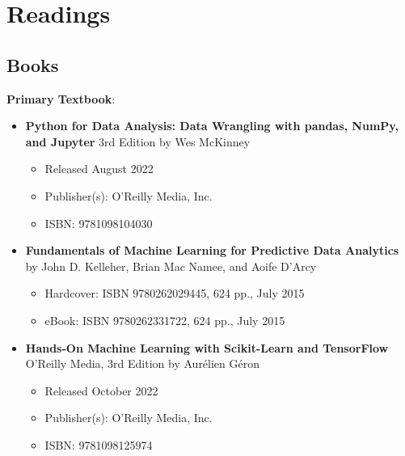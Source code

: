 \documentclass{article}
\begin{document}
\section{Readings}
\subsection{Books}
\textbf{Primary Textbook}:
  \begin{itemize}
    \item \textbf{Python for Data Analysis: Data Wrangling with pandas, NumPy, and Jupyter} 3rd Edition by Wes McKinney
    \begin{itemize}
        \item Released August 2022
        \item Publisher(s): O'Reilly Media, Inc.
        \item ISBN: 9781098104030
    \end{itemize}  
  \end{itemize}
  \begin{itemize}
    \item \textbf{Fundamentals of Machine Learning for Predictive Data Analytics} by John D. Kelleher, Brian Mac Namee, and Aoife D’Arcy
    \begin{itemize}
        \item Hardcover: ISBN 9780262029445, 624 pp., July 2015
        \item eBook: ISBN 9780262331722, 624 pp., July 2015
    \end{itemize} 
  \end{itemize}
  \begin{itemize}
  	\item \textbf{Hands-On Machine Learning with Scikit-Learn and TensorFlow} O'Reilly Media, 3rd Edition by Aurélien Géron
  	\begin{itemize}
        \item Released October 2022
        \item Publisher(s): O'Reilly Media, Inc.
        \item ISBN: 9781098125974
    \end{itemize}
  \end{itemize}
\end{document}
